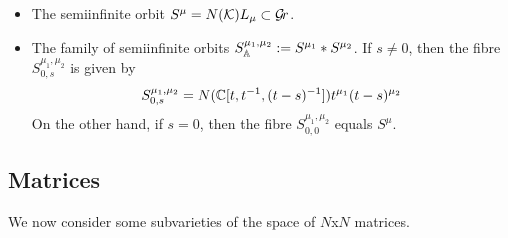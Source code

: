 \documentclass[draft]{article}
\begin{document}
\begin{itemize}
    \item The semiinfinite orbit $ S^\mu = N(\cK)L_\mu \subset \Gr $.  
    \item The family of semiinfinite orbits $ S^{\mu_1, \mu_2}_\AA := S^{\mu_1} * S^{\mu_2}$.  If $ s \ne 0 $, then the fibre $S^{\mu_1, \mu_2}_{0,s} $ is given by
    $$
    S^{\mu_1, \mu_2}_{0,s} = N(\CC[t, t^{-1}, (t-s)^{-1}])t^{\mu_1} (t-s)^{\mu_2}
    $$
    On the other hand, if $ s = 0$, then the fibre $S^{\mu_1, \mu_2}_{0,0} $ equals $ S^\mu$.
    
    
\end{itemize}

\subsection{Matrices}
We now consider some subvarieties of the space of $ N$x$N$ matrices.  

\end{document}

